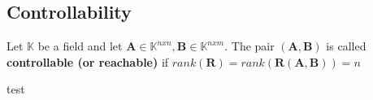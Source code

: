 \subsection{Controllability}

\begin{leftbar}
\begin{define}
    Let $\mathbb{K}$ be a field and let $\bm{A}\in\mathbb{K}^{nxn},\bm{B}\in\mathbb{K}^{nxm}$. The pair $(\bm{A},\bm{B})$ is called \textbf{controllable (or reachable)} if $rank(\bm{R})=rank(\bm{R}(\bm{A},\bm{B}))=n$
\end{define}
\end{leftbar}


test

%